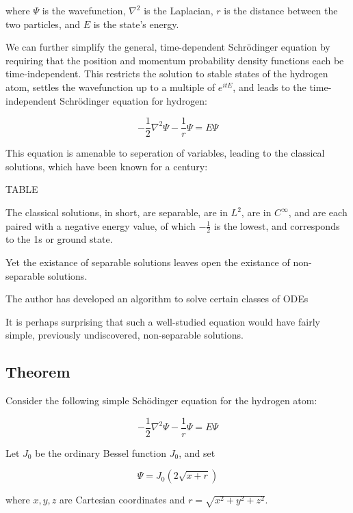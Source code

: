 \documentclass{article}
\begin{document}
where $\Psi$ is the wavefunction, $\nabla^2$ is the Laplacian,
$r$ is the distance between the two particles, and $E$ is the
state's energy.

We can further simplify the general, time-dependent Schr\"odinger equation
by requiring that the position and momentum probability density functions
each be time-independent.  This restricts the solution to stable states
of the hydrogen atom, settles the wavefunction up to a multiple of $e^{itE}$,
and leads to the time-independent Schr\"odinger equation for hydrogen:

\begin{equation*}
-\frac{1}{2}\nabla^2 \Psi - \frac{1}{r}\Psi = E \Psi
\end{equation*}

This equation is amenable to seperation of variables, leading to the
classical solutions, which have been known for a century:

TABLE

The classical solutions, in short, are separable, are in $L^2$, are in $C^\infty$,
and are each paired with a negative energy value, of which $-\frac{1}{2}$ is the lowest,
and corresponds to the 1s or ground state.

Yet the existance of separable solutions leaves open the existance of non-separable solutions.

The author has developed an algorithm to solve certain classes of ODEs

It is perhaps surprising that such a well-studied equation would have fairly simple, previously
undiscovered, non-separable solutions.

\subsection*{Theorem}
\parskip 0pt

Consider the following simple Sch\"odinger equation for the hydrogen atom:

\begin{equation}
\label{schrodinger}
-\frac{1}{2}\nabla^2 \Psi - \frac{1}{r}\Psi = E \Psi
\end{equation}

Let $J_0$ be the ordinary Bessel function $J_0$, and set

\begin{equation}
\label{solution}
\Psi = J_0(2\sqrt{x+r})
\end{equation}

where $x,y,z$ are Cartesian coordinates and $r=\sqrt{x^2+y^2+z^2}$.
\end{document}
